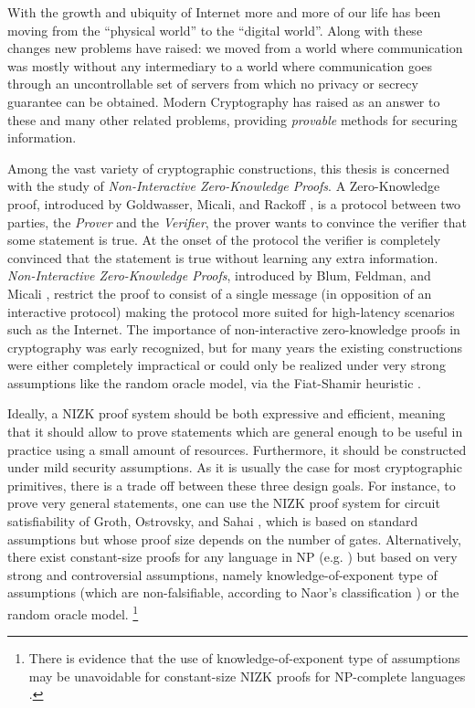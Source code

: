 With the growth and ubiquity of Internet more and more of our life has been moving from the ``physical world'' to the ``digital world''. Along with these changes new problems have raised: we moved from a world where communication was mostly without any intermediary to a world where communication goes through an uncontrollable set of servers from which no privacy or secrecy guarantee can be obtained. Modern Cryptography has raised as an answer to these and many other related problems, providing \emph{provable} methods for securing information.  

Among the vast variety of cryptographic constructions, this thesis is concerned with the study of \emph{Non-Interactive Zero-Knowledge Proofs}.
A Zero-Knowledge proof, introduced by Goldwasser, Micali, and Rackoff \cite{GolMicRac89}, is a protocol between two parties, the \emph{Prover} and the \emph{Verifier}, the prover wants to convince the verifier that some statement is true. At the onset of the protocol the verifier is completely convinced that the statement is true without learning any extra information. \emph{Non-Interactive Zero-Knowledge Proofs}, introduced by Blum, Feldman, and Micali \cite{STOC:BluFelMic88}, restrict the proof to consist of a single message (in opposition of an interactive protocol) making the protocol more suited for high-latency scenarios such as the Internet.
The importance of non-interactive zero-knowledge proofs in cryptography was early recognized, but for many years the existing constructions were either completely impractical or could only be realized under very strong assumptions like the random oracle model, via the Fiat-Shamir heuristic \cite{C:FiaSha86}. 

Ideally, a NIZK proof system should be both expressive and efficient, meaning that it should allow to prove
statements which are general enough to be useful in practice using a small amount of resources.
Furthermore, it should be constructed under
mild security assumptions.
As it is usually the case for most cryptographic primitives, there is a trade off between these three design goals.
For instance,
to prove very general statements, one can use the NIZK proof 
system for circuit satisfiability of Groth, Ostrovsky, and Sahai 
\cite{EC:GroOstSah06}, which is based on standard assumptions but 
whose proof size depends on the number of gates. 
Alternatively,
there exist constant-size proofs for any language in NP
  (e.g. \cite{EC:GGPR13}) but based on very strong and controversial assumptions, 
  namely knowledge-of-exponent type of assumptions 
  (which are non-falsifiable, according to Naor's classification 
  \cite{C:Naor03}) or the random oracle model. 
\footnote{There is evidence that the use of knowledge-of-exponent type of  assumptions 
may be unavoidable for constant-size NIZK proofs for NP-complete languages \cite{STOC:GenWic11}.}

